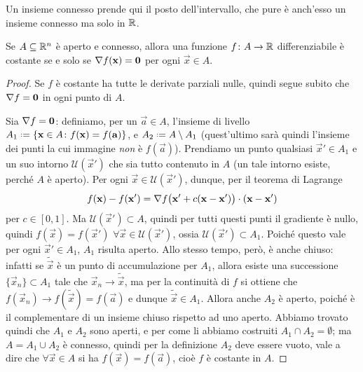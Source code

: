Un insieme connesso prende qui il posto dell'intervallo, che pure è anch'esso un insieme connesso ma solo in $\mathbb{R}$.
\begin{corollario}
	Se $A\subseteq\mathbb{R}^n$ è aperto e connesso, allora una funzione $f\colon A\to\mathbb{R}$ differenziabile è costante se e solo se $\nabla f(\mathbf{x})=\mathbf{0}$ per ogni $\vec x\in A$.
\end{corollario}
\begin{proof}
	Se $f$ è costante ha tutte le derivate parziali nulle, quindi segue subito che $\nabla f=\mathbf{0}$ in ogni punto di $A$.

	Sia $\nabla f=\mathbf{0}$: definiamo, per un $\vec a\in A$, l'insieme di livello $A_1\defeq\{\vec x\in A\colon f(\vec x)=f(\vec a)\}$, e $A_2\defeq A\setminus A_1$ (quest'ultimo sarà quindi l'insieme dei punti la cui immagine \emph{non} è $f(\vec a)$).
	Prendiamo un punto qualsiasi $\vec x'\in A_1$ e un suo intorno $\mathcal U(\vec x')$ che sia tutto contenuto in $A$ (un tale intorno esiste, perch\'e $A$ è aperto).
	Per ogni $\vec x\in\mathcal U(\vec x')$, dunque, per il teorema di Lagrange
	\begin{equation*}
		f(\mathbf{x})-f(\mathbf{x}')={\nabla f\big(\mathbf{x}'+c(\mathbf{x}-\mathbf{x}')\big)}\cdot{(\mathbf{x}-\mathbf{x}')}
	\end{equation*}
	per $c\in[0,1]$.
	Ma $\mathcal U(\vec x')\subset A$, quindi per tutti questi punti il gradiente è nullo, quindi $f(\vec x)=f(\vec x')$ $\forall\vec x\in\mathcal U(\vec x')$, ossia $\mathcal U(\vec x')\subset A_1$.
	Poich\'e questo vale per ogni $\vec x'\in A_1$, $A_1$ risulta aperto.
	Allo stesso tempo, però, è anche chiuso: infatti se $\tilde{\vec x}$ è un punto di accumulazione per $A_1$, allora esiste una successione $\{\vec x_n\}\subset A_1$ tale che $\vec x_n\to\tilde{\vec x}$, ma per la continuità di $f$ si ottiene che $f(\vec x_n)\to f(\tilde{\vec x})=f(\vec a)$ e dunque $\tilde{\vec x}\in A_1$.
	Allora anche $A_2$ è aperto, poich\'e è il complementare di un insieme chiuso rispetto ad uno aperto.
	Abbiamo trovato quindi che $A_1$ e $A_2$ sono aperti, e per come li abbiamo costruiti $A_1\cap A_2=\emptyset$; ma $A=A_1\cup A_2$ è connesso, quindi per la definizione $A_2$ deve essere vuoto, vale a dire che $\forall \vec x\in A$ si ha $f(\vec x)=f(\vec a)$, cioè $f$ è costante in $A$.
\end{proof}

